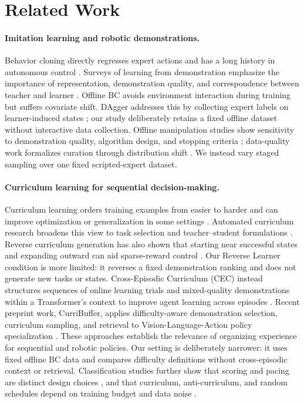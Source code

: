 \section{Related Work}
\label{sec:related}

\paragraph{Imitation learning and robotic demonstrations.}
Behavior cloning directly regresses expert actions and has a long history in
autonomous control \citep{pomerleau1989alvinn}. Surveys of learning from
demonstration emphasize the importance of representation, demonstration
quality, and correspondence between teacher and learner
\citep{argall2009survey,osa2018survey}. Offline BC avoids environment
interaction during training but suffers covariate shift. DAgger addresses this
by collecting expert labels on learner-induced states
\citep{ross2011dagger}; our study deliberately retains a fixed offline dataset
without interactive data collection. Offline manipulation studies show
sensitivity to demonstration quality, algorithm design, and stopping criteria
\citep{mandlekar2022what}; data-quality work formalizes curation through
distribution shift \citep{belkhale2023data}. We instead vary staged sampling
over one fixed scripted-expert dataset.

\paragraph{Curriculum learning for sequential decision-making.}
Curriculum learning orders training examples from easier to harder and can
improve optimization or generalization in some settings
\citep{bengio2009curriculum}. Automated curriculum research broadens this
view to task selection and teacher--student formulations
\citep{portelas2020survey}. Reverse curriculum generation has also shown that
starting near successful states and expanding outward can aid sparse-reward
control \citep{florensa2017reverse}. Our Reverse Learner condition is more
limited: it reverses a fixed demonstration ranking and does not generate new
tasks or states. Cross-Episodic Curriculum (CEC) instead structures sequences
of online learning trials and mixed-quality demonstrations within a
Transformer's context to improve agent learning across episodes
\citep{shi2023cross}. Recent preprint work, CurriBuffer, applies
difficulty-aware demonstration selection, curriculum sampling, and retrieval
to Vision-Language-Action policy specialization
\citep{hosseini2026curribuffer}. These approaches establish the
relevance of organizing experience for sequential and robotic policies. Our
setting is deliberately narrower: it uses fixed offline BC data and compares
difficulty definitions without cross-episodic context or retrieval.
Classification studies further show that scoring and pacing are distinct
design choices \citep{hacohen2019power}, and that curriculum,
anti-curriculum, and random schedules depend on training budget and data noise
\citep{wu2021when}.

